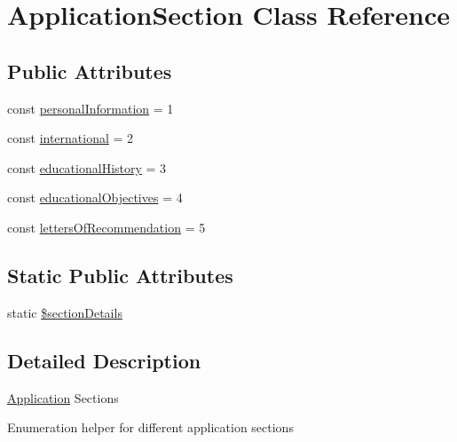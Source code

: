 \hypertarget{class_application_section}{\section{Application\-Section Class Reference}
\label{class_application_section}
}
\subsection*{Public Attributes}
\begin{DoxyCompactItemize}
\item 
const \hyperlink{class_application_section_a4ffe5fd237d50281ab1b19872a037a00}{personal\-Information} = 1
\item 
const \hyperlink{class_application_section_a1e94e4df26ec3841fe4769e5a5ce2e0e}{international} = 2
\item 
const \hyperlink{class_application_section_a6710b1bd47aefc8a4cd13fd475a3cf9a}{educational\-History} = 3
\item 
const \hyperlink{class_application_section_ab9dc9dc28ed62cb30f23364ba4a0c3a1}{educational\-Objectives} = 4
\item 
const \hyperlink{class_application_section_abdeadb9a28862222a367b07a4f2347a5}{letters\-Of\-Recommendation} = 5
\end{DoxyCompactItemize}
\subsection*{Static Public Attributes}
\begin{DoxyCompactItemize}
\item 
static \hyperlink{class_application_section_ab90668ddbdbf30045d89dba35051702c}{\$section\-Details}
\end{DoxyCompactItemize}


\subsection{Detailed Description}
\hyperlink{class_application}{Application} Sections

Enumeration helper for different application sections 

